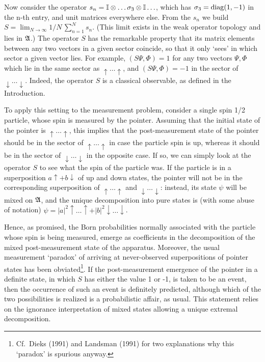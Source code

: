 \documentclass[12pt,titlepage]{article}
\newcommand{\sg}{\sigma}
\newcommand{\ps}{\psi}
\newcommand{\raw}{\rightarrow}
\newcommand{\A}{\frak A}
\newcommand{\fn}{\footnote}
\newcommand{\ot}{\otimes}
\newcommand{\up}{\uparrow}
\newcommand{\dow}{\downarrow}
\newcommand{\Up}{\uparrow\ldots\uparrow}
\newcommand{\Do}{\downarrow\ldots\downarrow}
\begin{document}
 Now consider the operator $s_n ={\Bbb I}\ot\ldots \sg_3\ot {\Bbb I}\ldots$,
which
has $\sg_3={\rm diag}(1,-1)$ in the n-th entry, and unit matrices everywhere
else.
 From the $s_n$ we build $S=\lim_{N\raw\infty}1/N\,\sum_{n=1}^N s_n$. (This
limit exists in the weak
operator topology and   lies in $\A$.) The operator $S$ has the remarkable
property that its matrix
elements between any two vectors in a given sector coincide, so that it only
`sees' in which sector
a given vector lies. For example, $(S\Psi,\Phi)=1$ for any two vectors
$\Psi,\Phi$ which lie in the same sector
as $\Up$, and $(S\Psi,\Phi)=-1$ in the sector of $\Do$.
Indeed, the  operator $S$ is a classical observable, as defined in the
Introduction.

To apply this setting to the measurement problem, consider a single spin 1/2
particle, whose spin is
measured by the pointer. Assuming that the initial state of the pointer is
$\Up$, this implies
that the post-measurement state of the pointer should be in the sector of $\Up$
in case  the
particle spin is up, whereas it should be in the sector of $\Do$ in the
opposite case.
If so, we can simply look at the operator $S$ to see what the spin of the
particle was.
If the particle is in a superposition $a\up+b\dow$ of up and down states, the
pointer will not be in
the corresponding superposition of $\Up$ and $\Do$: instead, its state $\psi$
will be mixed on $\A$,
and the unique decomposition into pure states is (with some abuse of notation)
$\ps=|a|^2
\Up+|b|^2\Do$.

Hence, as promised, the Born probabilities normally associated with the
particle whose
spin is being measured, emerge as coefficients in the decomposition of the
mixed post-measurement
state of the apparatus. Moreover, the usual measurement `paradox' of arriving
at
never-observed superpositions of    pointer states has been obviated\fn{Cf.\
Dieks (1991) and
Landsman (1991) for two explanations why this `paradox' is spurious anyway.}.
If the post-measurement
emergence of the pointer in a definite state, in which $S$ has either the value
1 or -1, is taken to
be an event, then the occurrence of such an event is definitely predicted,
although which   of the
two possibilities is realized is a probabilistic affair, as usual.  This
statement relies on the
ignorance interpretation of mixed states   allowing a unique extremal
decomposition.
\end{document}
